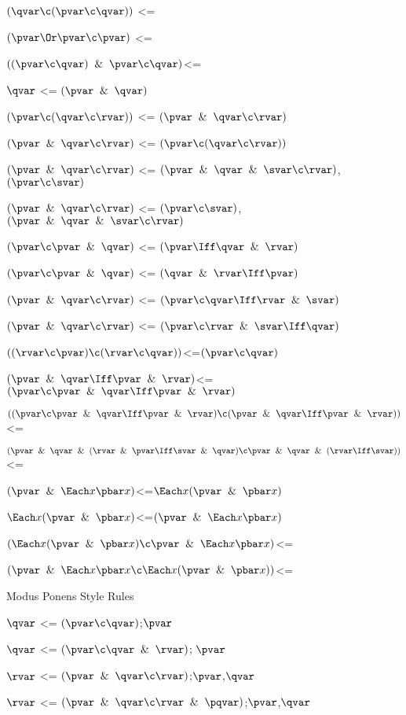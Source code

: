 $(\qvar \c (\pvar \c \qvar))$ <=

$(\pvar \Or \pvar \c \pvar)$ <=

$((\pvar \c \qvar) \And \pvar \c \qvar)$<=

$\qvar$ <= $(\pvar \And \qvar)$

$(\pvar \c (\qvar\c \rvar))$ <= $(\pvar \And \qvar \c \rvar)$

$(\pvar \And \qvar \c \rvar)$ <= $(\pvar \c (\qvar\c \rvar))$

$(\pvar \And \qvar \c \rvar)$ <= $(\pvar \And \qvar \And \svar \c \rvar)$,$(\pvar \c \svar)$

$(\pvar \And \qvar \c \rvar)$ <= $(\pvar \c \svar)$,$(\pvar \And \qvar \And \svar \c \rvar)$

$(\pvar \c \pvar \And \qvar)$ <= $(\pvar \Iff \qvar \And \rvar)$

$(\pvar \c \pvar \And \qvar)$ <= $(\qvar \And \rvar\Iff \pvar)$

$(\pvar \And \qvar \c \rvar)$ <= $(\pvar \c \qvar \Iff \rvar \And \svar)$

$(\pvar \And \qvar \c \rvar)$ <= $(\pvar \c \rvar \And \svar\Iff \qvar)$

$((\rvar \c \pvar) \c (\rvar \c \qvar))$<=$(\pvar \c \qvar)$

$(\pvar \And \qvar \Iff \pvar \And \rvar)$<=$(\pvar \c \pvar \And \qvar \Iff \pvar \And \rvar)$

$((\pvar \c \pvar \And \qvar \Iff \pvar \And \rvar) \c (\pvar \And \qvar \Iff \pvar \And \rvar))$<=

$(\pvar \And \qvar \And (\rvar \And \pvar \Iff \svar \And \qvar) \c \pvar \And \qvar \And (\rvar \Iff \svar))$<=

$(\pvar \And \Each x \pbar x)$<=$\Each x(\pvar \And \pbar x)$

$\Each x(\pvar \And \pbar x)$<=$(\pvar \And \Each x\pbar x)$

$(\Each x(\pvar \And \pbar x) \c \pvar \And \Each x\pbar x)$<=

$(\pvar \And \Each x \pbar x \c \Each x(\pvar \And \pbar x))$<=

\lineb


Modus Ponens Style Rules
\lineb

$\qvar$ <=  $(\pvar \c \qvar)$;$\pvar$

$\qvar$ <= $(\pvar \c \qvar\And \rvar)$; $\pvar$

$\rvar$ <=  $(\pvar \And \qvar\c \rvar)$;$\pvar$,$\qvar$

$\rvar$ <=  $(\pvar \And \qvar\c \rvar \And \pqvar)$;$\pvar$,$\qvar$

